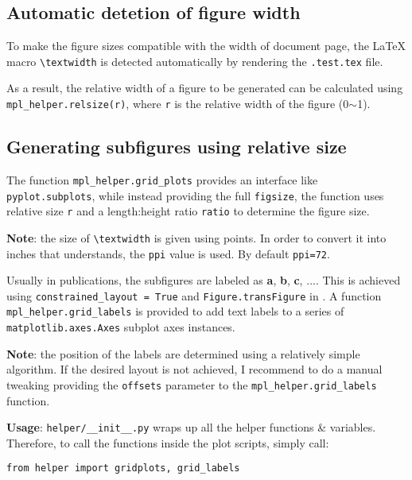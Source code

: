 \subsection{Automatic detetion of figure width}
\label{sec:autom-detet-figure}

To make the figure sizes compatible with the width of document page,
the \LaTeX{} macro \verb|\textwidth| is detected automatically by
rendering the \verb|.test.tex| file.


{\allowbreak
  As a result, the relative width of a figure to be generated can be
calculated using \verb|mpl_helper.relsize(r)|, where \texttt{r} is the
relative width of the figure (0$\sim{}$1).
\par}

\subsection{Generating subfigures using relative size}
\label{sec:gener-subf}

The function \verb|mpl_helper.grid_plots| provides an interface like
\verb|pyplot.subplots|, while instead providing the full
\texttt{figsize}, the function uses relative size \texttt{r} and a
length:height ratio \texttt{ratio} to determine the figure size.

\textbf{Note}: the size of \verb|\textwidth| is given using points. In
order to convert it into inches that \mpl{} understands, the
\verb|ppi| value is used. By default \verb|ppi=72|.

Usually in publications, the subfigures are labeled as \textbf{a},
\textbf{b}, \textbf{c}, $\dots$. This is achieved using
\verb|constrained_layout = True| and \verb|Figure.transFigure| in
\mpl{}. A function \verb|mpl_helper.grid_labels| is provided to add
text labels to a series of \verb|matplotlib.axes.Axes| subplot axes
instances. 

\textbf{Note}: the position of the labels are determined using a
relatively simple algorithm. If the desired layout is not achieved, I
recommend to do a manual tweaking providing the \verb|offsets|
parameter to the \verb|mpl_helper.grid_labels| function.

\textbf{Usage}: \verb|helper/__init__.py| wraps up all the helper
functions \& variables. Therefore, to call the functions inside the
plot scripts, simply call:
\begin{verbatim}
from helper import gridplots, grid_labels
\end{verbatim}

